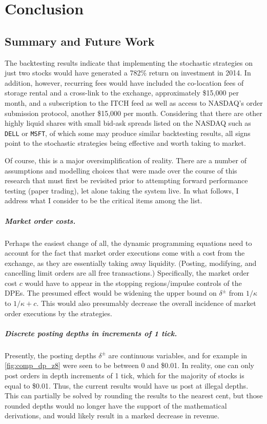 \chapter{Conclusion}

\section{Summary and Future Work}
The backtesting results indicate that implementing the stochastic strategies on just two stocks would have generated a 782\% return on investment in 2014. In addition, however, recurring fees would have included the co-location fees of storage rental and a cross-link to the exchange, approximately \$15,000 per month, and a subscription to the ITCH feed as well as access to NASDAQ's order submission protocol, another \$15,000 per month. Considering that there are other highly liquid shares with small bid-ask spreads listed on the NASDAQ such as \texttt{DELL} or \texttt{MSFT}, of which some may produce similar backtesting results, all signs point to the stochastic strategies being effective and worth taking to market.

Of course, this is a major oversimplification of reality. There are a number of assumptions and modelling choices that were made over the course of this research that must first be revisited prior to attempting forward performance testing (paper trading), let alone taking the system live. In what follows, I address what I consider to be the critical items among the list.

\paragraph{Market order costs.} Perhaps the easiest change of all, the dynamic programming equations need to account for the fact that market order executions come with a cost from the exchange, as they are essentially taking away liquidity. (Posting, modifying, and cancelling limit orders are all free transactions.) Specifically, the market order cost $c$ would have to appear in the stopping regions/impulse controls of the DPEs. The presumed effect would be widening the upper bound on $\delta^\pm$ from $1/\kappa$ to $1/\kappa + c$. This would also presumably decrease the overall incidence of market order executions by the strategies.

\paragraph{Discrete posting depths in increments of 1 tick.} Presently, the posting depths $\delta^\pm$ are continuous variables, and for example in \autoref{fig:comp_dp_z8} were seen to be between 0 and \$0.01. In reality, one can only post orders in depth increments of 1 tick, which for the majority of stocks is equal to \$0.01. Thus, the current results would have us post at illegal depths. This can partially be solved by rounding the results to the nearest cent, but those rounded depths would no longer have the support of the mathematical derivations, and would likely result in a marked decrease in revenue.

